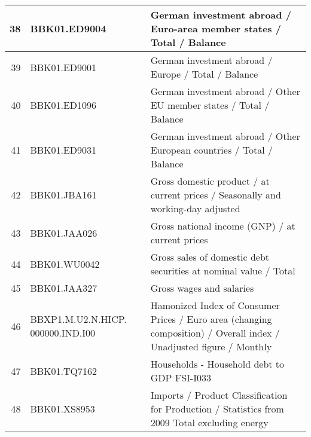\documentclass[11pt]{article}
\begin{document}
\begin{table}
\begin{tabular}{rp{5cm}p{11cm}}
  \hline
  38 & BBK01.ED9004 & German investment abroad / Euro-area member states / Total / Balance \\ 
  \hline
  39 & BBK01.ED9001 & German investment abroad / Europe / Total / Balance \\ 
  \hline
  40 & BBK01.ED1096 & German investment abroad / Other EU member states / Total / Balance \\   
  \hline
  41 & BBK01.ED9031 & German investment abroad / Other European countries / Total / Balance \\ 
  \hline
  42 & BBK01.JBA161 & Gross domestic product / at current prices / Seasonally and working-day adjusted \\ 
  \hline
  43 & BBK01.JAA026 & Gross national income (GNP) / at current prices \\ 
  \hline
  44 & BBK01.WU0042 & Gross sales of domestic debt securities at nominal value / Total \\ 
  \hline
  45 & BBK01.JAA327 & Gross wages and salaries \\ 
  \hline
  46 & BBXP1.M.U2.N.HICP. 000000.IND.I00 & Hamonized Index of Consumer Prices / Euro area (changing composition) / Overall index / Unadjusted figure / Monthly \\ 
  \hline
  47 & BBK01.TQ7162 & Households - Household debt to GDP FSI-I033 \\ 
  \hline
  48 & BBK01.XS8953 & Imports / Product Classification for Production / Statistics from 2009 Total excluding energy \\ 
\end{tabular}
\end{table}
\end{document}
